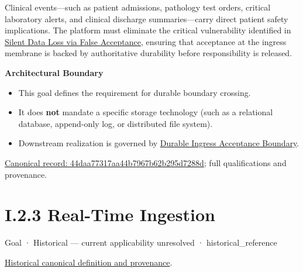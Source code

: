 Clinical events—such as patient admissions, pathology test orders, critical laboratory alerts, and clinical discharge summaries—carry direct patient safety implications. The platform must eliminate the critical vulnerability identified in \href{\detokenize{../../../../../../../../docs/markdown/01-motivation/drivers-assessments/assessments.md}}{Silent Data Loss via False Acceptance}, ensuring that acceptance at the ingress membrane is backed by authoritative durability before responsibility is released.



\par\medskip\textbf{Architectural Boundary}\par


\begin{itemize}


\item This goal defines the requirement for durable boundary crossing.

\item It does \textbf{not} mandate a specific storage technology (such as a relational database, append-only log, or distributed file system).

\item Downstream realization is governed by \href{\detokenize{../../../../../../../../docs/markdown/01-motivation/requirements-constraints/foundational-requirements.md}}{\texttt{} Durable Ingress Acceptance Boundary}.

\end{itemize}

{\footnotesize \href{../../../../../../../continuum/motivation/goal/44daa77317aa44b7967b62b295d7288d.md}{Canonical record: 44daa77317aa44b7967b62b295d7288d}; full qualifications and provenance.}\par
\section*{I.2.3 Real-Time Ingestion}
\label{navigation:I.2.3}

\label{element:d43c345839e548589e2b6aa677022f8b}
{\small Goal · Historical — current applicability unresolved · historical\_reference}\par
\href{../../../../../../../continuum/motivation/goal/d43c345839e548589e2b6aa677022f8b.md}{Historical canonical definition and provenance}.\par
